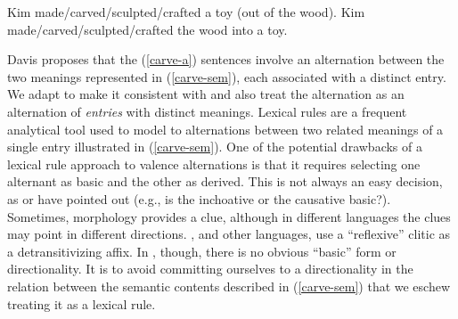 \documentclass[output=paper
 	        ,biblatex
                ,babelshorthands
                ,newtxmath
                ,draftmode
                ,colorlinks, citecolor=brown
]{langscibook}
\begin{document}
\begin{exe}
\ex\label{carve}
\begin{xlist}
	\ex\label{carve-a} Kim made/carved/sculpted/crafted a toy (out of the wood).
	\ex\label{carve-b} Kim made/carved/sculpted/crafted the wood into a toy.
\end{xlist}
\end{exe}

\noindent
Davis proposes that the (\ref{carve-a}) sentences involve an alternation between the two meanings represented in (\ref{carve-sem}), each associated with a distinct entry. We adapt \citet{Davis2001} to make it consistent with \citet{KoenigandDavis2006} and also treat the alternation as an alternation of \emph{entries} with distinct meanings. 
Lexical rules are a frequent analytical tool used to model to alternations between two related meanings of a single entry illustrated in (\ref{carve-sem}). One of the potential drawbacks of a lexical rule approach to valence alternations is that it requires selecting one alternant as basic and the other as derived. This is not always an easy decision, as \citet{Goldberg1995}\addpages or \citet{LevinandRappaport1994} have pointed out (e.g., is the inchoative or the causative basic?). Sometimes, morphology provides a clue, although in different languages the clues may point in different directions.  , and other  languages, use a ``reflexive'' clitic as a detransitivizing affix.  In , though, there is no obvious ``basic'' form or directionality. It is to avoid committing ourselves to a directionality in the relation between the semantic contents described in (\ref{carve-sem}) that we eschew treating it as a lexical rule.

\end{document}
